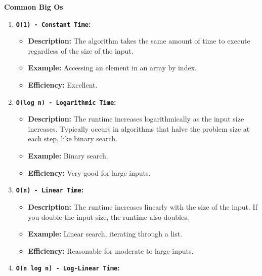 \documentclass[
  letterpaper,
  DIV=11,
  numbers=noendperiod]{scrreprt}
\providecommand{\tightlist}{%
  \setlength{\itemsep}{0pt}\setlength{\parskip}{0pt}}
\begin{document}
\begin{tcolorbox}[enhanced jigsaw, colframe=quarto-callout-note-color-frame, toprule=.15mm, bottomrule=.15mm, rightrule=.15mm, colback=white, breakable, arc=.35mm, opacityback=0, left=2mm, leftrule=.75mm]

\vspace{-3mm}\textbf{Common Big Os}\vspace{3mm}

\begin{enumerate}
\def\labelenumi{\arabic{enumi}.}
\tightlist
\item
  \textbf{\texttt{O(1)\ -\ Constant\ Time}:}

  \begin{itemize}
  \tightlist
  \item
    \textbf{Description:} The algorithm takes the same amount of time to
    execute regardless of the size of the input.
  \item
    \textbf{Example:} Accessing an element in an array by index.
  \item
    \textbf{Efficiency:} Excellent.
  \end{itemize}
\item
  \textbf{\texttt{O(log\ n)\ -\ Logarithmic\ Time}:}

  \begin{itemize}
  \tightlist
  \item
    \textbf{Description:} The runtime increases logarithmically as the
    input size increases. Typically occurs in algorithms that halve the
    problem size at each step, like binary search.
  \item
    \textbf{Example:} Binary search.
  \item
    \textbf{Efficiency:} Very good for large inputs.
  \end{itemize}
\item
  \textbf{\texttt{O(n)\ -\ Linear\ Time}:}

  \begin{itemize}
  \tightlist
  \item
    \textbf{Description:} The runtime increases linearly with the size
    of the input. If you double the input size, the runtime also
    doubles.
  \item
    \textbf{Example:} Linear search, iterating through a list.
  \item
    \textbf{Efficiency:} Reasonable for moderate to large inputs.
  \end{itemize}
\item
  \textbf{\texttt{O(n\ log\ n)\ -\ Log-Linear\ Time}:}


\end{enumerate}
\end{tcolorbox}
\end{document}

